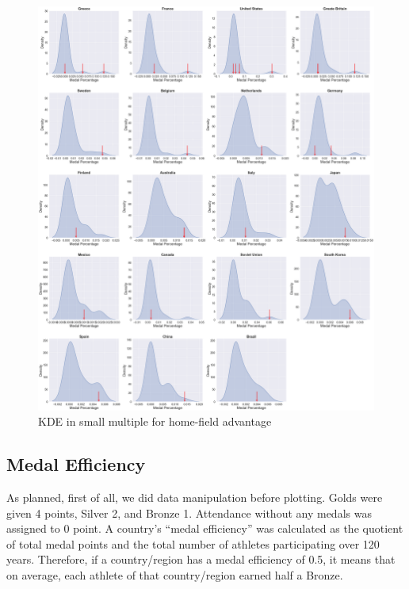 \documentclass[
]{article}
\begin{document}
\begin{figure}

{\centering \includegraphics[width=1\linewidth]{static/pics/g-2-9} 

}

\caption{KDE in small multiple for home-field advantage}\label{fig:figure32}
\end{figure}

\hypertarget{plots-medal-efficiency}{%
\subsection{Medal Efficiency}\label{plots-medal-efficiency}}

As planned, first of all, we did data manipulation before plotting. Golds were given 4 points, Silver 2, and Bronze 1. Attendance without any medals was assigned to 0 point. A country's ``medal efficiency'' was calculated as the quotient of total medal points and the total number of athletes participating over 120 years. Therefore, if a country/region has a medal efficiency of 0.5, it means that on average, each athlete of that country/region earned half a Bronze.
\end{document}
